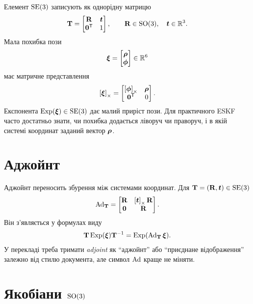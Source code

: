 Елемент $\mathrm{SE}(3)$ записують як однорідну матрицю
\begin{equation}
\mathbf{T}=\begin{bmatrix}
\mathbf{R}&\bm{t}\\
\bm{0}^{\mathsf{T}}&1
\end{bmatrix},
\qquad
\mathbf{R}\in\mathrm{SO}(3),\quad \bm{t}\in\mathbb{R}^3.
\end{equation}
Мала похибка пози
\begin{equation}
\bm{\xi}=\begin{bmatrix}\bm{\rho}\\\bm{\phi}\end{bmatrix}\in\mathbb{R}^6
\end{equation}
має матричне представлення
\begin{equation}
\left[\bm{\xi}\right]_{\times}=\begin{bmatrix}
\left[\bm{\phi}\right]_{\times}&\bm{\rho}\\
\bm{0}^{\mathsf{T}}&0
\end{bmatrix}.
\end{equation}
Експонента $\operatorname{Exp}(\bm{\xi})\in\mathrm{SE}(3)$ дає малий приріст пози. Для практичного ESKF часто достатньо знати, чи похибка додається ліворуч чи праворуч, і в якій системі координат заданий вектор $\bm{\rho}$.

\section{Аджойнт}

Аджойнт переносить збурення між системами координат. Для $\mathbf{T}=(\mathbf{R},\bm{t})\in\mathrm{SE}(3)$
\begin{equation}\label{eq:adjoint_SE3_session02}
\operatorname{Ad}_{\mathbf{T}}=
\begin{bmatrix}
\mathbf{R}&\left[\bm{t}\right]_{\times}\mathbf{R}\\
\mathbf{0}&\mathbf{R}
\end{bmatrix}.
\end{equation}
Він з'являється у формулах виду
\begin{equation}
\mathbf{T}\operatorname{Exp}(\bm{\xi})\mathbf{T}^{-1}
=\operatorname{Exp}(\operatorname{Ad}_{\mathbf{T}}\bm{\xi}).
\end{equation}
У перекладі треба тримати \emph{adjoint} як ``аджойнт'' або ``приєднане відображення'' залежно від стилю документа, але символ $\operatorname{Ad}$ краще не міняти.

\section{Якобіани $\mathrm{SO}(3)$}

